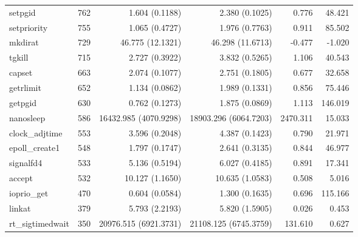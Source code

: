 \begin{longtable}{>{\ttfamily}lrrrrr}
                        setpgid &        762 &              1.604 (0.1188) &            2.380 (0.1025) &           0.776 &       48.421 \\
                    setpriority &        755 &              1.065 (0.4727) &            1.976 (0.7763) &           0.911 &       85.502 \\
                        mkdirat &        729 &            46.775 (12.1321) &          46.298 (11.6713) &          -0.477 &       -1.020 \\
                         tgkill &        715 &              2.727 (0.3922) &            3.832 (0.5265) &           1.106 &       40.543 \\
                         capset &        663 &              2.074 (0.1077) &            2.751 (0.1805) &           0.677 &       32.658 \\
                      getrlimit &        652 &              1.134 (0.0862) &            1.989 (0.1331) &           0.856 &       75.446 \\
                        getpgid &        630 &              0.762 (0.1273) &            1.875 (0.0869) &           1.113 &      146.019 \\
                      nanosleep &        586 &       16432.985 (4070.9298) &     18903.296 (6064.7203) &        2470.311 &       15.033 \\
                 clock\_adjtime &        553 &              3.596 (0.2048) &            4.387 (0.1423) &           0.790 &       21.971 \\
                 epoll\_create1 &        548 &              1.797 (0.1747) &            2.641 (0.3135) &           0.844 &       46.977 \\
                      signalfd4 &        533 &              5.136 (0.5194) &            6.027 (0.4185) &           0.891 &       17.341 \\
                         accept &        532 &             10.127 (1.1650) &           10.635 (1.0583) &           0.508 &        5.016 \\
                    ioprio\_get &        470 &              0.604 (0.0584) &            1.300 (0.1635) &           0.696 &      115.166 \\
                         linkat &        379 &              5.793 (2.2193) &            5.820 (1.5905) &           0.026 &        0.453 \\
               rt\_sigtimedwait &        350 &       20976.515 (6921.3731) &     21108.125 (6745.3759) &         131.610 &        0.627 \\

\end{longtable}
